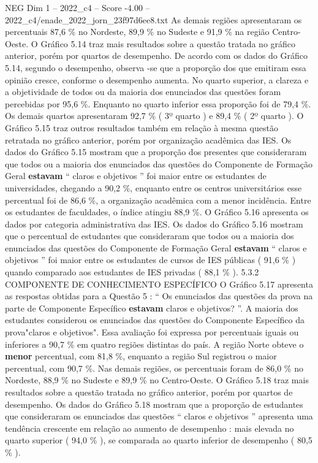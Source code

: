 \begin{textsample}{NEG Dim 1 – 2022\_c4 – Score -4.00 – 2022\_c4/enade\_2022\_jorn\_23f97d6ee8.txt}
As demais regiões apresentaram os percentuais 87,6 \% no Nordeste, 89,9 \% no Sudeste e 91,9 \% na região Centro-Oeste.
O Gráfico 5.14 traz mais resultados sobre a questão tratada no gráfico anterior, porém por quartos de desempenho.
De acordo com os dados do Gráfico 5.14, segundo o desempenho, observa -se que a proporção dos que emitiram essa opinião cresce, conforme o desempenho aumenta.
No quarto superior, a clareza e a objetividade de todos ou da maioria dos enunciados das questões foram percebidas por 95,6 \%.
Enquanto no quarto inferior essa proporção foi de 79,4 \%.
Os demais quartos apresentaram 92,7 \% ( 3º quarto ) e 89,4 \% ( 2º quarto ).
O Gráfico 5.15 traz outros resultados também em relação à mesma questão retratada no gráfico anterior, porém por organização acadêmica das IES.
Os dados do Gráfico 5.15 mostram que a proporção dos presentes que consideraram que todos ou a maioria dos enunciados das questões do Componente de Formação Geral \textbf{estavam} “ claros e objetivos ” foi maior entre os estudantes de universidades, chegando a 90,2 \%, enquanto entre os centros universitários esse percentual foi de 86,6 \%, a organização acadêmica com a menor incidência.
Entre os estudantes de faculdades, o índice atingiu 88,9 \%.
O Gráfico 5.16 apresenta os dados por categoria administrativa das IES.
Os dados do Gráfico 5.16 mostram que o percentual de estudantes que consideraram que todos ou a maioria dos enunciados das questões do Componente de Formação Geral \textbf{estavam} “ claros e objetivos ” foi maior entre os estudantes de cursos de IES públicas ( 91,6 \% ) quando comparado aos estudantes de IES privadas ( 88,1 \% ). 5.3.2 COMPONENTE DE CONHECIMENTO ESPECÍFICO O Gráfico 5.17 apresenta as respostas obtidas para a Questão 5 : “ Os enunciados das questões da prova na parte de Componente Específico \textbf{estavam} claros e objetivos? ”.
A maioria dos estudantes considerou os enunciados das questões do Componente Específico da prova"claros e objetivos".
Essa avaliação foi expressa por percentuais iguais ou inferiores a 90,7 \% em quatro regiões distintas do país.
A região Norte obteve o \textbf{menor} percentual, com 81,8 \%, enquanto a região Sul registrou o maior percentual, com 90,7 \%.
Nas demais regiões, os percentuais foram de 86,0 \% no Nordeste, 88,9 \% no Sudeste e 89,9 \% no Centro-Oeste.
O Gráfico 5.18 traz mais resultados sobre a questão tratada no gráfico anterior, porém por quartos de desempenho.
Os dados do Gráfico 5.18 mostram que a proporção de estudantes que consideraram os enunciados das questões “ claros e objetivos ” apresenta uma tendência crescente em relação ao aumento de desempenho : mais elevada no quarto superior ( 94,0 \% ), se comparada ao quarto inferior de desempenho ( 80,5 \% ).

\end{textsample}
